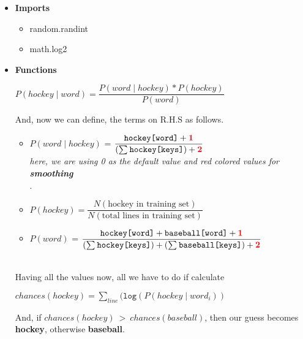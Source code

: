 \documentclass{article}
\begin{document}
    \begin{itemize}
        \item \textbf{Imports}
            \begin{itemize}
                \item random.randint
                \item math.log2
            \end{itemize}
        \item \textbf{Functions}
        \begin{center}
                \begin{center}
                    \(P(hockey \mid word) = \dfrac{P(word \mid hockey)*P(hockey)}{P(word)}\)
                \end{center}
                And, now we can define, the terms on R.H.S as follows.
                \vspace{+5mm}
                \begin{itemize}
                    \item \(P(word\mid hockey)\) = \(\dfrac{\texttt{hockey[word]}+\textcolor{red}{\textbf{1}}}{(\sum_{}^{}\texttt{hockey[keys]})+\textcolor{red}{\textbf{2}}}\) \\[2mm]
                    {\scriptsize \emph{     here, we are using 0 as the default value and red colored values for \textbf{smoothing} \\}.}
                    \item \(P(hockey) = \dfrac{N(\text{hockey in training set})}{N(\text{total lines in training set})}\) \ \\[5mm] 
                    \item \(P(word)\) = \(\dfrac{\texttt{hockey[word]}+\texttt{baseball[word]}+\textcolor{red}{\textbf{1}}}{(\sum_{}^{}\texttt{hockey[keys]})+(\sum_{}^{}\texttt{baseball[keys]})+\textcolor{red}{\textbf{2}}}\)
                \end{itemize}
                \  \\[5mm]Having all the values now, all we have to do if calculate \\
                \begin{center}
                    \(chances(hockey) = \sum_{line}(\texttt{log}(P(hockey\mid word_i))\)
                \end{center}
                And, if \(chances(hockey)\ \mathcal{>} \  chances(baseball)\), then our guess becomes \textbf{hockey}, otherwise \textbf{baseball}.
        \end{center}
    \end{itemize}
    
\end{document}
